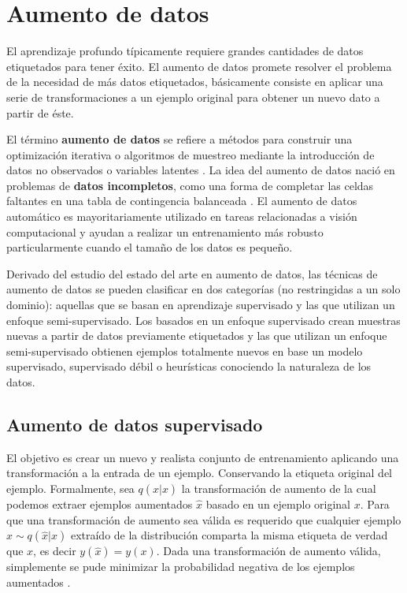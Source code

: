 
\section{Aumento de datos}

El aprendizaje profundo típicamente requiere grandes cantidades de datos etiquetados para tener éxito. El aumento de datos promete resolver el problema de la necesidad de más datos etiquetados, básicamente consiste en aplicar una serie de transformaciones a un ejemplo original para obtener un nuevo dato a partir de éste.

El término \textbf{aumento de datos} se refiere a métodos para construir una optimización iterativa o algoritmos de muestreo mediante la introducción de datos no observados o variables latentes \citep{van2001art}. La idea del aumento de datos nació en problemas de \textbf{datos incompletos}, como una forma de completar las celdas faltantes en una tabla de contingencia balanceada \citep{dempster1977maximum}. El aumento de datos automático es mayoritariamente utilizado en tareas relacionadas a visión computacional y ayudan a realizar un entrenamiento más robusto particularmente cuando el tamaño de los datos es pequeño. 


Derivado del estudio del estado del arte en aumento de datos, las técnicas de aumento de datos se pueden clasificar en dos categorías (no restringidas a un solo dominio): aquellas que se basan en aprendizaje supervisado y las que utilizan un enfoque semi-supervisado. Los basados en un enfoque supervisado crean muestras nuevas a partir de datos previamente etiquetados y las que utilizan un enfoque semi-supervisado obtienen ejemplos totalmente nuevos en base un modelo supervisado, supervisado débil o heurísticas conociendo la naturaleza de los datos.


\subsection{Aumento de datos supervisado} El objetivo es crear un nuevo y realista conjunto de entrenamiento aplicando una transformación a la entrada de un ejemplo. Conservando la etiqueta original del ejemplo. Formalmente, sea $q(\hat{x}|x)$ la transformación de aumento de la cual podemos extraer  ejemplos aumentados $\hat{x}$ basado en un ejemplo original $x$. Para que una transformación de aumento sea válida es requerido que cualquier ejemplo $\hat{x} \sim q(\hat{x}|x)$ extraído de la distribución comparta la misma etiqueta de verdad que $x$, es decir $y(\hat{x})=y(x)$. Dada una transformación de aumento válida, simplemente se pude minimizar la probabilidad negativa de los ejemplos aumentados \citep{xie2019unsupervised}. 

